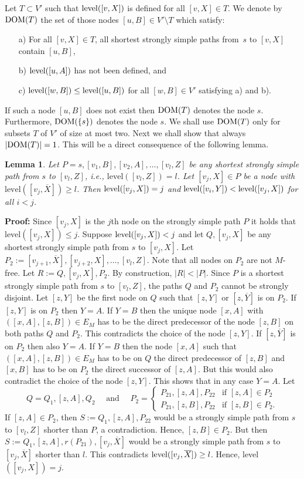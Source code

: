 \documentclass[12pt,twoside,a4paper]{article}
\newtheorem{lemma}{Lemma}
\def\DOM{{\rm DOM}}
\def\lev{{\rm level}}
\begin{document}
Let $T \subset V'$ such that $\lev([v,X])$ is defined for all $[v,X] \in  T$.
We denote by $\DOM(T)$ the set of those nodes 
$[u,B]\in V'\setminus T$ which satisfy:
\begin{itemize}
\item[a)] For all $[v,X] \in T$, all shortest strongly simple paths from~$s$ to
$[v,X]$ contain $[u,B]$,
\item[b)] $\lev([u,A])$ has not been defined, and
\item[c)] $\lev([w,B]) \leq \lev([u,B])$ for all $[w,B]\in V'$ satisfying a) and b).
\end{itemize}
If such a node $[u,B]$ does not exist then $\DOM(T)$ denotes the node $s$.
Furthermore, $\DOM(\{s\})$ denotes the node $s$.
We shall use $\DOM(T)$ only for subsets $T$ of $V'$ of size at most two.
Next we shall show that always $|\DOM(T)| = 1$. 
This will be a direct consequence of the following lemma.
\begin{lemma} \label{hk1}
Let $P = s,[v_1,B],[v_2,A], \ldots ,[v_l,Z]$ be any shortest strongly simple
path from $s$ to $[v_l,Z]$, i.e., $\mbox{level}([v_l,Z]) = l$. Let $[v_j,X]
\in P$ be a node with $\mbox{level}([v_j,\overline{X}]) \geq l$. Then $\lev([v_j,X]) = j$ 
and $\lev([v_i,Y]) < \lev([v_j,X])$ for all $i<j$.
\end{lemma}
{\bf Proof:} 
Since $[v_j,X]$ is the $j$th node on the strongly simple path $P$ it holds that
level$([v_j,X]) \leq j$.
Suppose $\lev([v_j,X]) < j$ and let $Q,[v_j,X]$ be any shortest strongly simple path
from $s$ to $[v_j,X]$. Let $P_2 := [v_{j+1},\overline{X}],[v_{j+2},X], \ldots,[v_l,Z]$. 
Note that all nodes on $P_2$ are not $M$-free. Let $R := Q,[v_j,X],P_2$.
By construction, $|R| < |P|$. Since $P$ is a shortest strongly simple path from $s$ 
to $[v_l,Z]$, the paths $Q$ and $P_2$ cannot be strongly disjoint. Let $[z,Y]$ be the
first node on $Q$ such that $[z,Y]$ or $[z,\overline{Y}]$ is on $P_2$. 
If $[z,Y]$ is on $P_2$ then $Y = A$. If $Y = B$ then the unique node $[x,A]$ with
$([x,A],[z,B]) \in E_M$ has to be the direct predecessor of the node $[z,B]$ on both 
paths $Q$ and $P_2$. This contradicts the choice of the node $[z,Y]$. 
If $[z,\overline{Y}]$ is on $P_2$ then also $Y = A$. If $Y = B$ then the node $[x,A]$ 
such that $([x,A],[z,B]) \in E_M$ has to be on $Q$ the direct predecessor of $[z,B]$ 
and $[x,B]$ has to be on $P_2$ the direct successor of $[z,A]$.
But this would also contradict the choice of the node $[z,Y]$. This shows
that in any case $Y = A$. Let
$$Q = Q_1,[z,A],Q_2 \quad \mbox{ and } \quad 
P_2 = \left\{ \begin{array}{ll}
               P_{21},[z,A],P_{22} & \mbox{if $[z,A] \in P_2$} \\
               P_{21},[z,B],P_{22} & \mbox{if $[z,B] \in P_2$.} 
              \end{array} \right.
$$
If $[z,A] \in P_2$, then $S := Q_1,[z,A],P_{22}$ would be a strongly 
simple path from $s$ to $[v_l,Z]$ shorter than $P$, a contradiction. 
Hence, $[z,B] \in P_2$. But then
$S := Q_1,[z,A],r(P_{21}),[v_j,\overline{X}]$
would be a strongly simple path from $s$ to $[v_j,\overline{X}]$ shorter than $l$. This
contradicts $\lev([v_j,\overline{X}]) \geq l$. Hence, level$([v_j,X]) = j$.
\end{document}
